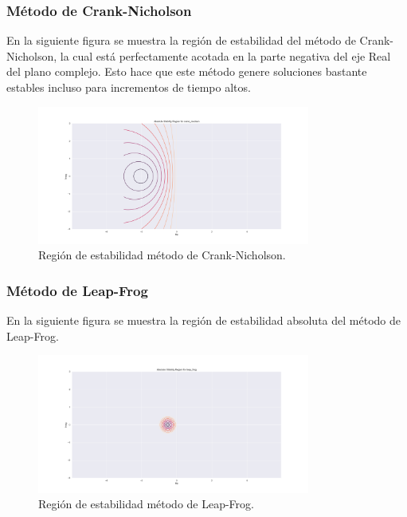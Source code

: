 \documentclass[12pt,a4paper]{article}
\begin{document}
\subsubsection{Método de Crank-Nicholson}
En la siguiente figura se muestra la región de estabilidad del método de Crank-Nicholson, la cual está perfectamente acotada en la parte negativa del eje Real del plano complejo. Esto hace que este método genere soluciones bastante estables incluso para incrementos de tiempo altos.
\begin{figure}[H]
	\centering
	\includegraphics[width=0.8\textwidth]{FIGURES/mil4/st_crank.png}
	\caption{Región de estabilidad método de Crank-Nicholson.}
	\label{st_crank}
\end{figure}


\subsubsection{Método de Leap-Frog}
En la siguiente figura se muestra la región de estabilidad absoluta del método de Leap-Frog.
\begin{figure}[H]
	\centering
	\includegraphics[width=0.8\textwidth]{FIGURES/mil4/st_leap.png}
	\caption{Región de estabilidad método de Leap-Frog.}
	\label{st_leap}
\end{figure}




\end{document}
